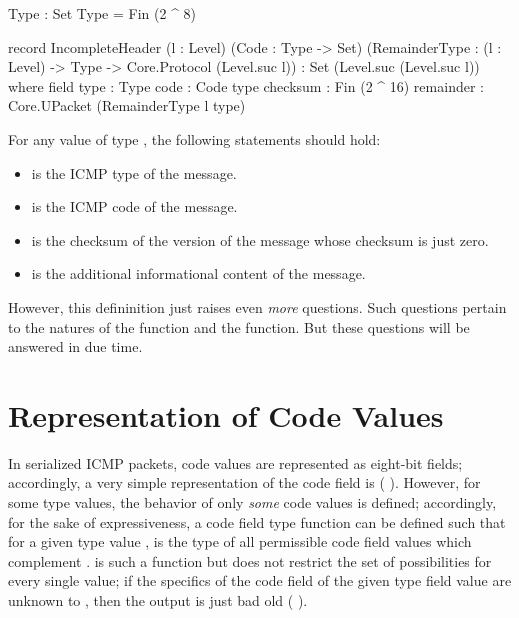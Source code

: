 \documentclass{report}
\begin{document}
\begin{itemize}
\begin{code}
  Type : Set
  Type = Fin (2 ^ 8)

  record IncompleteHeader (l : Level)
                          (Code : Type -> Set)
                          (RemainderType : (l : Level) ->
                                           Type ->
                                           Core.Protocol (Level.suc l)) :
                          Set (Level.suc (Level.suc l)) where
    field
      type : Type
      code : Code type
      checksum : Fin (2 ^ 16)
      remainder : Core.UPacket (RemainderType l type)
\end{code}

For any value  of type    , the following statements should hold:

\begin{itemize}
  \item {}  is the ICMP type of the  message.
  \item {}  is the ICMP code of the  message.
  \item {}  is the checksum of the version of the  message whose checksum is just zero.
  \item {}  is the additional informational content of the  message.
\end{itemize}

However, this defininition just raises even \emph{more} questions.  Such questions pertain to the natures of the  function and the  function.  But these questions will be answered in due time.

\section{Representation of Code Values}
In serialized ICMP packets, code values are represented as eight-bit fields; accordingly, a very simple representation of the code field is  \AgdaSymbol( \AgdaOperator{\AgdaFunction{\textasciicircum{}}} \AgdaSymbol).  However, for some type values, the behavior of only \emph{some} code values is defined; accordingly, for the sake of expressiveness, a code field type function  can be defined such that for a given type value ,   is the type of all permissible code field values which complement .   is such a function but does not restrict the set of possibilities for every single  value; if the specifics of the code field of the given type field value are unknown to , then the output is just bad old  \AgdaSymbol( \AgdaOperator{\AgdaFunction{\textasciicircum{}}} \AgdaSymbol).


\end{itemize}
\end{document}
